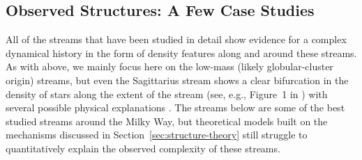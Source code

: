 \documentclass[final,5p,times,twocolumn,authoryear]{elsarticle}
\begin{document}
\subsection{Observed Structures: A Few Case Studies}
\label{sec:structure-obs}

All of the streams that have been studied in detail show evidence for a complex
dynamical history in the form of density features along and around these streams.
As with above, we mainly focus here on the low-mass (likely globular-cluster origin)
streams, but even the Sagittarius stream shows a clear bifurcation in the density of
stars along the extent of the stream (see, e.g., Figure~1 in \citealt{belokurov:2006})
with several possible physical explanations \citep[e.g.,][]{penarrubia:2010,
vasiliev:2020, vasiliev:2021}.
The streams below are some of the best studied streams around the Milky Way, but
theoretical models built on the mechanisms discussed in
Section~\ref{sec:structure-theory} still struggle to quantitatively explain the observed
complexity of these streams.
\end{document}
